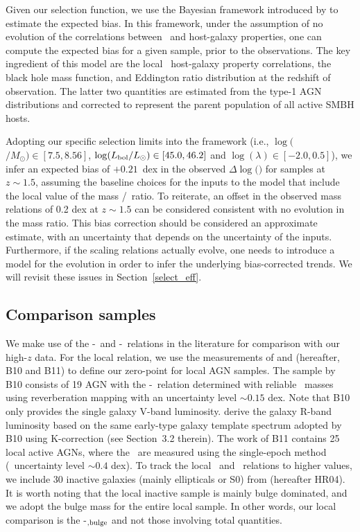 \documentclass[apj]{emulateapj}
\begin{document}
Given our selection function, we use the Bayesian framework introduced by \citet{Schulze2011,Schulze2014} to estimate the expected bias. In this framework, under the assumption of no evolution of the correlations between \mbh\ and host-galaxy properties, one can compute the expected bias for a given sample, prior to the observations. The key ingredient of this model are the local \mbh\ host-galaxy property correlations, the black hole mass function, and Eddington ratio distribution at the redshift of observation. The latter two quantities are estimated from the type-1 AGN distributions \citep{Schulze2015} and corrected to represent the parent population of all active SMBH hosts. %

Adopting our specific selection limits into the framework (i.e., $\log($\mbh$/M_{\odot})\in[7.5, 8.56]$, $\log(L_{\rm bol}/L_{\odot})\in[45.0, 46.2] $ and  $\log(\lambda) \in [-2.0, 0.5]$), we infer an expected bias of $+0.21$~dex in the observed $\Delta\log($\mbh$)$ for samples at $z\sim1.5$, assuming the baseline choices for the inputs to the model that include the local value of the mass \mbh/\smass ~ratio. To reiterate, an offset in the observed mass relations of 0.2 dex at $z\sim1.5$ can be considered consistent with no evolution in the mass ratio. This bias correction should be considered an approximate estimate, with an uncertainty that depends on the uncertainty of the inputs. Furthermore, if the scaling relations actually evolve, one needs to introduce a model for the evolution in order to infer the underlying bias-corrected trends. We will revisit these issues in Section~\ref{select_eff}.

\subsection{Comparison samples}\label{sec:compare_sample}

We make use of the \mbh-\lhost\ and \mbh-\smass\ relations in the literature for comparison with our high-$z$ data. For the local relation, we use the measurements of \citet{Ben++10} and \citet{Bennert++2011} (hereafter, B10 and B11) to define our zero-point for local AGN samples. The sample by B10 consists of 19 AGN with the \mbh-\lhost\ relation determined with reliable \mbh\ masses using reverberation mapping with an uncertainty level $\sim0.15$ dex. Note that B10 only provides the single galaxy V-band luminosity. \citet{Ding2017b} derive the galaxy R-band luminosity based on the same early-type galaxy template spectrum adopted by B10 using K-correction (see Section~3.2 therein). The work of B11 contains 25 local active AGNs, where the \mbh\ are measured using the single-epoch method (\mbh\ uncertainty level $\sim0.4$ dex). To track the local \smass\ and \mbh\  relations to higher values, we include 30 inactive galaxies (mainly ellipticals or S0) from \citet{H+R04} (hereafter HR04). It is worth noting that the local inactive sample is mainly bulge dominated, and we adopt the bulge mass for the entire local sample. In other words, our local comparison is the \mbh-\smass$_{\rm ,bulge}$ and not those involving total quantities.
\end{document}

